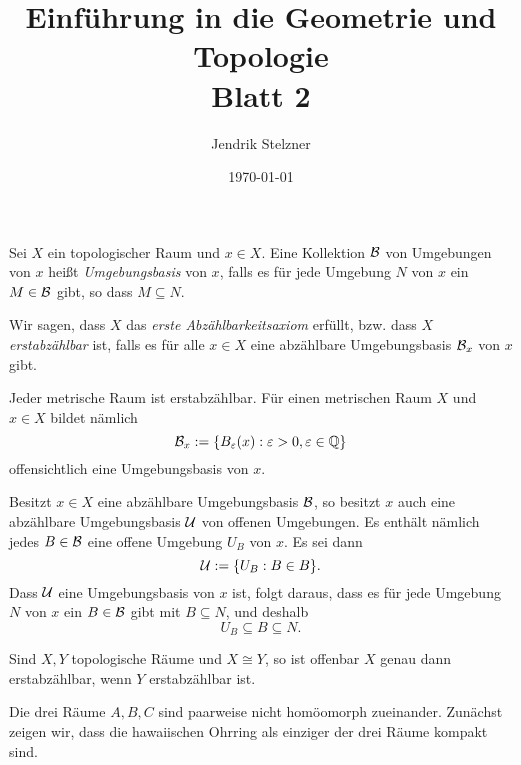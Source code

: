 \documentclass[a4paper,10pt]{article}
\title{\sc Einführung in die Geometrie und Topologie \\ \Large Blatt 2}
\author{Jendrik Stelzner}
\date{\today}
\begin{document}
\maketitle





\section{}
\begin{defi}
 Sei $X$ ein topologischer Raum und $x \in X$. Eine Kollektion $\mathcal{B}$ von Umgebungen von $x$ heißt \emph{Umgebungsbasis} von $x$, falls es für jede Umgebung $N$ von $x$ ein $M \in \mathcal{B}$ gibt, so dass $M \subseteq N$.
 
 Wir sagen, dass $X$ das \emph{erste Abzählbarkeitsaxiom} erfüllt, bzw. dass $X$ \emph{erstabzählbar} ist, falls es für alle $x \in X$ eine abzählbare Umgebungsbasis $\mathcal{B}_x$ von $x$ gibt.
\end{defi}


\begin{bem}\label{bem: metrische Räume erstabzählbar}
 Jeder metrische Raum ist erstabzählbar. Für einen metrischen Raum $X$ und $x \in X$ bildet nämlich
 \[
  \mathcal{B}_x := \{B_\varepsilon(x) : \varepsilon > 0, \varepsilon \in \mathbb{Q}\}
 \]
 offensichtlich eine Umgebungsbasis von $x$.
\end{bem}


\begin{bem}\label{bem: offene Umgebungsbasis}
 Besitzt $x \in X$ eine abzählbare Umgebungsbasis $\mathcal{B}$, so besitzt $x$ auch eine abzählbare Umgebungsbasis $\mathcal{U}$ von offenen Umgebungen. Es enthält nämlich jedes $B \in \mathcal{B}$ eine offene Umgebung $U_B$ von $x$. Es sei dann
 \[
  \mathcal{U} := \{U_B : B \in B\}.
 \]
 Dass $\mathcal{U}$ eine Umgebungsbasis von $x$ ist, folgt daraus, dass es für jede Umgebung $N$ von $x$ ein $B \in \mathcal{B}$ gibt mit $B \subseteq N$, und deshalb
 \[
  U_B \subseteq B \subseteq N.
 \]
\end{bem}



\begin{bem}\label{bem: erstabzählbar homöomorphieinvarinat}
 Sind $X, Y$ topologische Räume und $X \cong Y$, so ist offenbar $X$ genau dann erstabzählbar, wenn $Y$ erstabzählbar ist.
\end{bem}


Die drei Räume $A, B, C$ sind paarweise nicht homöomorph zueinander. Zunächst zeigen wir, dass die hawaiischen Ohrring als einziger der drei Räume kompakt sind.
\end{document}
